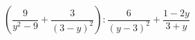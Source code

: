 \begin{ex}[type=expression]
	\begin{condition}
		\(\left( \dfrac{9}{y^2-9}+\dfrac{3}{(3-y)^2} \right):\dfrac{6}{(y-3)^2}+\dfrac{1-2y}{3+y}\)
	\end{condition}
\end{ex}